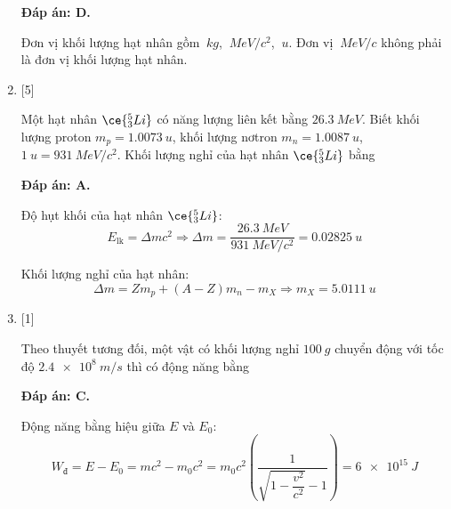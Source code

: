 \begin{enumerate}[label=\bfseries Câu \arabic*:]
	\loigiai
	{		\textbf{Đáp án: D.}
		
		Đơn vị khối lượng hạt nhân gồm $\SI{}{kg}$, $\SI{}{MeV/c^2}$, $\SI{}{u}$. Đơn vị $\SI{}{MeV/c}$ không phải là đơn vị khối lượng hạt nhân.
		
	}
	
	\item {} [5]
	\cauhoi
	{Một hạt nhân $\ce{^5_3 Li}$ có năng lượng liên kết bằng $\SI{26.3}{MeV}$. Biết khối lượng proton $m_p=\SI{1.0073}{u}$, khối lượng nơtron $m_n=\SI{1.0087}{u}$, $\SI{1}{u}=\SI{931}{MeV/c^2}$. Khối lượng nghỉ của hạt nhân $\ce{^5_3 Li}$ bằng
	}
	
	\loigiai
	{		\textbf{Đáp án: A.}
		
		Độ hụt khối của hạt nhân $\ce{^5_3 Li}$:
		$$E_\text{lk} = \Delta m c^2 \Rightarrow \Delta m = \dfrac{\SI{26.3}{MeV}}{\SI{931}{MeV/c^2}} = \SI{0.02825}{u}$$
		
		Khối lượng nghỉ của hạt nhân:
		$$\Delta m = Z m_p + (A-Z)m_n - m_X \Rightarrow m_X = \SI{5.0111}{u}$$
		
	}
	
	\item {} [1]
	\cauhoi
	{Theo thuyết tương đối, một vật có khối lượng nghỉ $\SI{100}{g}$ chuyển động với tốc độ $\SI{2.4e8}{m/s}$ thì có động năng bằng
	}
	
	\loigiai
	{		\textbf{Đáp án: C.}
		
		Động năng bằng hiệu giữa $E$ và $E_0$:
		$$W_\text{đ} = E-E_0 = mc^2 - m_0 c^2 = m_0 c^2 \left(\dfrac{1}{\sqrt{1-\dfrac{v^2}{c^2}}-1}\right) = \SI{6e15}{J}$$
		
	}
	
	
\end{enumerate}
